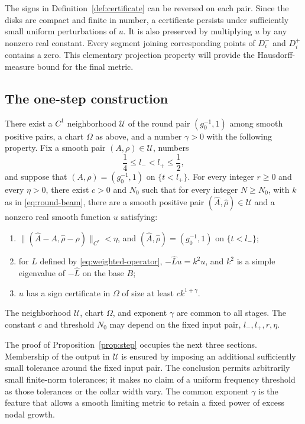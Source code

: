 The signs in Definition~\ref{def:certificate} can be reversed on each
pair. Since the disks are compact and finite in number, a certificate
persists under sufficiently small uniform perturbations of $u$.
It is also preserved by multiplying $u$ by any nonzero real constant.
Every segment joining corresponding points of $D_i^-$ and $D_i^+$
contains a zero. This elementary projection property will provide the
Hausdorff-measure bound for the final metric.

\subsection{The one-step construction}

\begin{proposition}\label{prop:step}
There exist a $C^1$ neighborhood $\mathcal U$ of the round pair
$(g_0^{-1},1)$ among smooth positive pairs, a chart $\Omega$ as above,
and a number $\gamma>0$ with the following property.
Fix a smooth pair $(A,\rho)\in\mathcal U$, numbers
\[
 \frac14\le l_-<l_+\le\frac12,
\]
and suppose that $(A,\rho)=(g_0^{-1},1)$ on $\{t<l_+\}$.
For every integer $r\ge0$ and every $\eta>0$, there exist $c>0$ and
$N_0$ such that for every integer $N\ge N_0$, with $k$ as in
\eqref{eq:round-beam}, there are a smooth positive pair
$(\widehat A,\widehat\rho)\in\mathcal U$ and a nonzero real smooth
function $u$ satisfying:
\begin{enumerate}[label=\textup{(\roman*)}]
 \item $\|(\widehat A-A,\widehat\rho-\rho)\|_{C^r}<\eta$, and
 $(\widehat A,\widehat\rho)=(g_0^{-1},1)$ on $\{t<l_-\}$;
 \item for $\widehat L$ defined by \eqref{eq:weighted-operator},
 $-\widehat Lu=k^2u$, and $k^2$ is a simple eigenvalue of
 $-\widehat L$ on the base $B$;
 \item $u$ has a sign certificate in $\Omega$ of size at least
 $c k^{1+\gamma}$.
\end{enumerate}
The neighborhood $\mathcal U$, chart $\Omega$, and exponent $\gamma$
are common to all stages. The constant $c$ and threshold $N_0$ may
depend on the fixed input pair, $l_-,l_+,r,\eta$.
\end{proposition}

The proof of Proposition~\ref{prop:step} occupies the next three
sections. Membership of the output in $\mathcal U$ is ensured by
imposing an additional sufficiently small tolerance around the fixed
input pair. The conclusion permits arbitrarily small finite-norm
tolerances; it makes no claim of a uniform frequency threshold as
those tolerances or the collar width vary. The common exponent
$\gamma$ is the feature that allows a smooth limiting metric to retain
a fixed power of excess nodal growth.
